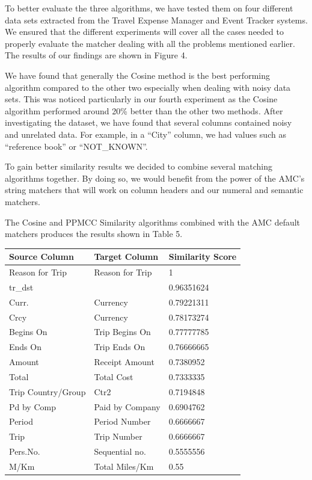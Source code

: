 \documentclass{sig-alternate}
\begin{document}
To better evaluate the three algorithms, we have tested them on four different data sets extracted from the Travel Expense Manager and Event Tracker systems. We ensured that the different experiments will cover all the cases needed to properly evaluate the matcher dealing with all the problems mentioned earlier. The results of our findings are shown in Figure 4.


We have found that generally the Cosine method is the best performing algorithm compared to the other two especially when dealing with noisy data sets. This was noticed particularly in our fourth experiment as the Cosine algorithm performed around 20\% better than the other two methods. After investigating the dataset, we have found that several columns contained noisy and unrelated data. For example, in a ``City'' column, we had values such as ``reference book'' or ``NOT\_KNOWN''.

To gain better similarity results we decided to combine several matching algorithms together. By doing so, we would benefit from the power of the AMC's string matchers that will work on column headers and our numeral and semantic matchers.

The Cosine and PPMCC Similarity algorithms combined with the AMC default matchers produces the results shown in Table 5.

\begin{tabular}{|p{0.7in}|p{0.8in}|p{0.8in}|} \hline
\textbf{Source Column} & \textbf{Target Column} & \textbf{Similarity Score} \\ \hline
Reason for Trip & Reason for Trip & 1 \\ \hline
tr\_dst &  & 0.96351624 \\ \hline
Curr. & Currency & 0.79221311 \\ \hline
Crcy & Currency & 0.78173274 \\ \hline
Begins On & Trip Begins On & 0.77777785 \\ \hline
Ends On & Trip Ends On & 0.76666665 \\ \hline
Amount & Receipt Amount & 0.7380952 \\ \hline
Total & Total Cost & 0.7333335 \\ \hline
Trip Country/Group & Ctr2 & 0.7194848 \\ \hline
Pd by Comp & Paid by Company & 0.6904762 \\ \hline
Period & Period Number & 0.6666667 \\ \hline
Trip & Trip Number & 0.6666667 \\ \hline
Pers.No. & Sequential no. & 0.5555556 \\ \hline
M/Km & Total Miles/Km & 0.55 \\ \hline
\end{tabular}
\end{document}
